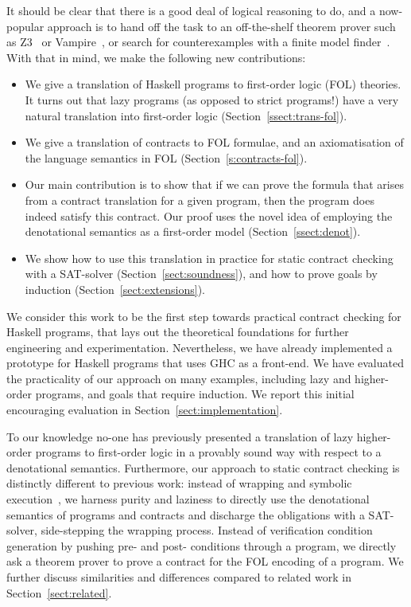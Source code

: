 It should be clear that there is a good deal of logical reasoning to do,
and a now-popular approach is to hand off the task to an off-the-shelf theorem
prover such as Z3~\cite{z3citation} or Vampire~\cite{vampire}, or search for 
counterexamples with a finite model finder~\cite{paradox}.
With that in mind, we make the following new contributions:

\begin{itemize}
  \item We give a translation of Haskell programs to first-order logic (FOL) theories. 
        It turns out that lazy programs (as opposed to
        strict programs!) have a very natural translation into first-order logic
        (Section~\ref{ssect:trans-fol}).
  \item We give a translation of contracts to FOL formulae, and an axiomatisation of 
        the language semantics in FOL 
        (Section~\ref{s:contracts-fol}).
  \item Our main contribution is to show that if we can prove the formula 
        that arises from a contract translation 
        for a given program, then the program does indeed satisfy this contract. Our proof
        uses the novel idea of employing the denotational 
        semantics as a first-order model (Section~\ref{ssect:denot}).
  \item We show how to use this translation in practice for static contract checking with
        a SAT-solver (Section~\ref{sect:soundness}), 
        and how to prove goals by induction (Section~\ref{sect:extensions}).
\end{itemize}

We consider this work to be the first step towards practical contract checking 
for Haskell programs, that lays out the theoretical foundations for further engineering 
and experimentation. Nevertheless, we have already implemented a prototype for Haskell 
programs that uses GHC as a front-end. We have evaluated the practicality of our approach 
on many examples, including lazy and higher-order programs, and goals that require 
induction. We report this initial encouraging evaluation in 
Section~\ref{sect:implementation}. 

To our knowledge no-one has previously presented a translation of lazy higher-order programs to 
first-order logic in a provably sound way with respect to a denotational
semantics. Furthermore, our approach to static contract checking is 
distinctly different to previous work: instead of wrapping and 
symbolic execution~\cite{xu+:contracts,Xu:2012:HCC:2103746.2103767}, 
we harness purity and laziness to directly use the denotational semantics
of programs and contracts and discharge the obligations with a SAT-solver, side-stepping
the wrapping process. Instead of verification condition generation by pushing
pre- and post- conditions through a program, we directly ask a theorem prover to prove 
a contract for the FOL encoding of a program. 
We further discuss similarities and differences compared to related work in Section~\ref{sect:related}.

